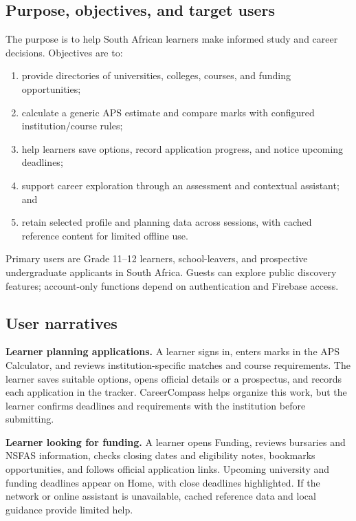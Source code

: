 \documentclass[11pt,a4paper]{article}
\begin{document}
\subsection{Purpose, objectives, and target users}
The purpose is to help South African learners make informed study and career decisions. Objectives are to:
\begin{enumerate}
\item provide directories of universities, colleges, courses, and funding opportunities;
\item calculate a generic APS estimate and compare marks with configured institution/course rules;
\item help learners save options, record application progress, and notice upcoming deadlines;
\item support career exploration through an assessment and contextual assistant; and
\item retain selected profile and planning data across sessions, with cached reference content for limited offline use.
\end{enumerate}
Primary users are Grade 11--12 learners, school-leavers, and prospective undergraduate applicants in South Africa. Guests can explore public discovery features; account-only functions depend on authentication and Firebase access.

\subsection{User narratives}
\textbf{Learner planning applications.} A learner signs in, enters marks in the APS Calculator, and reviews institution-specific matches and course requirements. The learner saves suitable options, opens official details or a prospectus, and records each application in the tracker. CareerCompass helps organize this work, but the learner confirms deadlines and requirements with the institution before submitting.

\textbf{Learner looking for funding.} A learner opens Funding, reviews bursaries and NSFAS information, checks closing dates and eligibility notes, bookmarks opportunities, and follows official application links. Upcoming university and funding deadlines appear on Home, with close deadlines highlighted. If the network or online assistant is unavailable, cached reference data and local guidance provide limited help.
\end{document}
